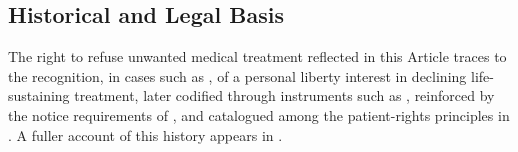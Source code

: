 \subsection{Historical and Legal Basis}
The right to refuse unwanted medical treatment reflected in this Article traces to the recognition, in cases such as \citet{quinlan1976}, of a personal liberty interest in declining life-sustaining treatment, later codified through instruments such as \citet{uhcda1993}, reinforced by the notice requirements of \citet{psda1990}, and catalogued among the patient-rights principles in \citet{aha1973}. A fuller account of this history appears in \citet{meisel2004}.
